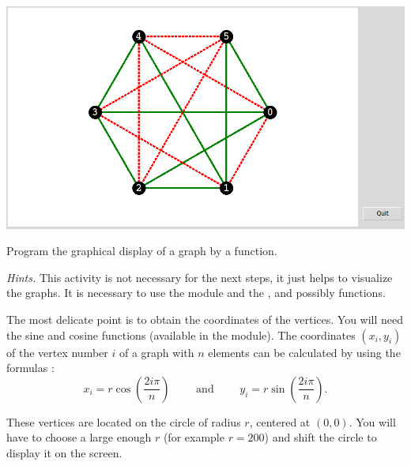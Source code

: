\documentclass[11pt,class=report,crop=false]{standalone}
\begin{document}
\begin{activite}


\begin{center}
\includegraphics[scale=\myscale,scale=0.4]{screen-ramsey-2-en}
\end{center}


Program the graphical display of a graph by a  function.
     
\bigskip
     
\emph{Hints.} This activity is not necessary for the next steps, it just helps to visualize the graphs. It is necessary to use the  module and the ,  and possibly  functions. 

The most delicate point is to obtain the coordinates of the vertices. You will need the sine and cosine functions (available in the  module).
The coordinates $(x_i,y_i)$ of the vertex number $i$ of a graph with $n$ elements can be calculated by using the formulas :
$$x_i = r \cos\left(\frac{2 i \pi}{n}\right) \qquad \text{ and } \qquad y_i = r\sin\left(\frac{2 i \pi}{n}\right).$$

These vertices are located on the circle of radius $r$, centered at $(0,0)$. 
You will have to choose a large enough $r$ (for example $r=200$) and shift the circle to display it on the screen.


\end{activite}

\end{document}
